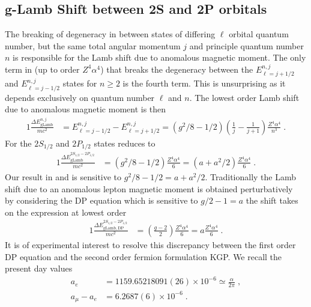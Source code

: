 \subsection{g-Lamb Shift between 2S and 2P orbitals} \label{lamb}
The breaking of degeneracy in  between states of differing $\ell$ orbital quantum number, but the same total angular momentum $j$ and principle quantum number $n$ is responsible for the Lamb shift due to anomalous magnetic moment. The only term in  (up to order $Z^{4}\alpha^{4}$) that breaks the degeneracy between the $E^{n,j}_{\ell=j+1/2}$ and $E^{n,j}_{\ell=j-1/2}$ states for $n\geq2$ is the fourth term. This is unsurprising as it depends exclusively on quantum number $\ell$ and $n$. The lowest order Lamb shift due to anomalous magnetic moment is then
\begin{alignat}{1}
\label{lamb01} \frac{\Delta E_{\mathrm{gLamb}}^{n,j}}{mc^{2}}&=E^{n,j}_{\ell=j-1/2}-E^{n,j}_{\ell=j+1/2}=\left(g^{2}/8-1/2\right)\left(\frac{1}{j}-\frac{1}{j+1}\right)\frac{Z^{4}\alpha^{4}}{n^{3}}\;.
\end{alignat}
For the $2S_{1/2}$ and $2P_{1/2}$ states  reduces to
\begin{alignat}{1}
\label{lamb02} \frac{\Delta E_{\mathrm{gLamb}}^{2S_{1/2}-2P_{1/2}}}{mc^{2}}&=\left(g^{2}/8-1/2\right)\frac{Z^{4}\alpha^{4}}{6}=\left(a+a^{2}/2\right)\frac{Z^{4}\alpha^{4}}{6}\;.
\end{alignat}
Our result in  and  is sensitive to $g^{2}/8-1/2=a+a^{2}/2$. Traditionally the Lamb shift due to an anomalous lepton magnetic moment is obtained perturbatively~\citep{Itzykson:1980rh} by considering the DP equation which is sensitive to $g/2-1=a$ the shift takes on the expression at lowest order
\begin{alignat}{1}
\label{lamb03} \frac{\Delta E_{\mathrm{gLamb,DP}}^{2S_{1/2}-2P_{1/2}}}{mc^{2}}&=\left(\frac{g-2}{2}\right)\frac{Z^{4}\alpha^{4}}{6}=a\frac{Z^{4}\alpha^{4}}{6}\;.
\end{alignat}
It is of experimental interest to resolve this discrepancy between the first order DP equation and the second order fermion formulation KGP. We recall the present day values
\begin{subequations}
\begin{alignat}{1}
\label{aeFULL} a_e&=1159.65218091(26)\times 10^{-6}\simeq \frac{\alpha}{2\pi}\;,\\
a_\mu-a_e&=6.2687(6)\times 10^{-6}\;.
\end{alignat}
\end{subequations}
